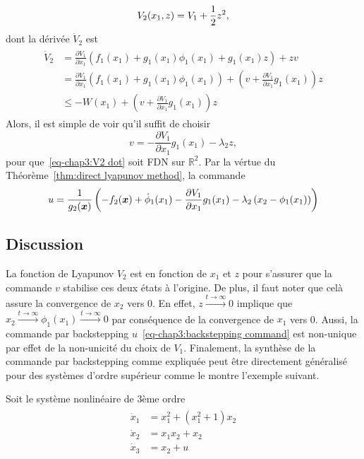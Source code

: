 \begin{equation}
	V_2(x_1,z)=V_1 + \frac{1}{2} z^2,
\end{equation}	
dont la dérivée $\dot{V}_2$ est 
\begin{align}\label{eq-chap3:V2 dot}
	\begin{split}
		\dot{V}_2 &= \frac{\partial V_1}{\partial x_1}\left(f_1(x_1) + g_1(x_1)\phi_1(x_1) + g_1(x_1)z\right) + zv \\ 
		&= \frac{\partial V_1}{\partial x_1}\left(f_1(x_1) + g_1(x_1)\phi_1(x_1)\right) + \left(v + \frac{\partial V_1}{\partial x_1}g_1(x_1)\right)z \\
		&\leq -W(x_1) + \left(v + \frac{\partial V_1}{\partial x_1}g_1(x_1)\right)z
	\end{split}
\end{align}
Alors, il est simple de voir qu'il suffit de choisir 
\begin{equation}\label{eq-chap3:integrator input backstepping}
	v= -\frac{\partial V_1}{\partial x_1}g_1(x_1) - \lambda_2z,
\end{equation}
pour que~\eqref{eq-chap3:V2 dot} soit FDN sur $\mathbb{R}^2$. Par la vértue du Théorème~\ref{thm:direct lyapunov method}, la commande 
\begin{equation}\label{eq-chap3:backstepping command}
	u = \frac{1}{g_2(\bm{x})}\left(-f_2(\bm{x}) +\dot{\phi}_1(x_1) -\frac{\partial V_1}{\partial x_1}g_1(x_1) - \lambda_2\left(x_2-\phi_1(x_1)\right)\right)
\end{equation}
\subsection{Discussion}
La fonction de Lyapunov $V_2$ est en fonction de $x_1$ et $z$ pour s'assurer que la commande $v$ stabilise ces deux états à l'origine. De plus, il faut noter que celà assure la convergence de $x_2$ vers 0. En effet, $z\overset{t\rightarrow\infty}{\longrightarrow}0$ implique que $ x_2\overset{t\rightarrow\infty}{\longrightarrow}\phi_1(x_1)\overset{t\rightarrow\infty}{\longrightarrow}0$ par conséquence de la convergence de $x_1$ vers 0. 
Aussi, la commande par backstepping $u$~\eqref{eq-chap3:backstepping command} est non-unique par effet de la non-unicité du choix de $V_1$. Finalement, la synthèse de la commande par backstepping comme expliquée  peut être directement généralisé pour des systèmes d'ordre supérieur comme le montre l'exemple suivant. 
\begin{example}
	Soit le système nonlinéaire de 3ème ordre 
	\begin{align}
		\begin{split}
			\dot{x}_1&= x_1^2 + (x_1^2+1)x_2 \\
			\dot{x}_2&= x_1x_2 + x_2\\
			\dot{x}_3&= x_2 + u 
		\end{split}
	\end{align}
\end{example}

